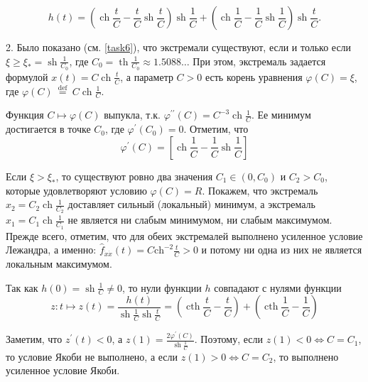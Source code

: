 \begin{task}
\begin{equation*}
h(t)=\left(\operatorname{ch} \frac{t}{C}-\frac{t}{C} \operatorname{sh} \frac{t}{C}\right) \operatorname{sh} \frac{1}{C}+\left(\operatorname{ch} \frac{1}{C}-\frac{1}{C} \operatorname{sh} \frac{1}{C}\right) \operatorname{sh} \frac{t}{C} .
\end{equation*}

2. Было показано (см. \ref{task6}), что экстремали существуют, 
если и только если $\xi \geq \xi_{*}=\operatorname{sh} \frac{1}{C_0}$, 
где $C_0=\operatorname{th} \frac{1}{C_0} \approx 1.5088 \ldots$ При этом, экстремаль задается формулой 
$x(t)=C \operatorname{ch} \frac{t}{C}$, а параметр $C>0$ есть корень уравнения $\varphi(C) = \xi$, 
где $\varphi(C) \stackrel{\text { def }}{=} C \operatorname{ch} \frac{1}{C}$. 

Функция $C \mapsto \varphi(C)$ выпукла, т.к. $\varphi^{\prime \prime}(C)=C^{-3} \operatorname{ch} \frac{1}{C}$. 
Ее минимум достигается в точке $C_0$, где $\varphi^{\prime}\left(C_0\right)=0$. Отметим, что
$$
\varphi^{\prime}(C)=\left[\operatorname{ch} \frac{1}{C}-\frac{1}{C} \operatorname{sh} \frac{1}{C}\right]
$$

Если $\xi > \xi_{*}$, то существуют ровно два значения $C_1 \in\left(0, C_0\right)$ и $C_2>C_0$, 
которые удовлетворяют условию $\varphi(C)=R$. Покажем, что экстремаль $\widehat{x}_2=C_2 \operatorname{ch} \frac{1}{C_2}$ 
доставляет сильный (локальный) минимум, а экстремаль $\widehat{x}_1=C_1 \operatorname{ch} \frac{1}{C_1}$ 
не является ни слабым минимумом, ни слабым максимумом. Прежде всего, отметим, что для обеих экстремалей выполнено 
усиленное условие Лежандра, а именно: $\widehat{f}_{\dot{x} \dot{x}}(t)=C \mathrm{ch}^{-2} \frac{t}{C} > 0$ 
и потому ни одна из них не является локальным максимумом. \par


Так как $h(0)=\operatorname{sh} \frac{1}{C} \neq 0$, то нули функции $h$ совпадают с нулями функции
$$
z: t \mapsto z(t)=\frac{h(t)}{\operatorname{sh} \frac{1}{C} \operatorname{sh} \frac{t}{C}}=\left(\operatorname{cth} \frac{t}{C}-\frac{t}{C}\right)+\left(\operatorname{cth} \frac{1}{C}-\frac{1}{C}\right)
$$

Заметим, что $z^{\prime}(t)<0$, а $z(1) = \frac{2 \varphi^{\prime}(C)}{\operatorname{sh} \frac{1}{C}}$. 
Поэтому, если $z(1)<0 \Leftrightarrow C=C_1$, то условие Якоби не выполнено, а если $z(1) > 0 \Leftrightarrow C=C_2$, 
то выполнено усиленное условие Якоби.

\end{task}